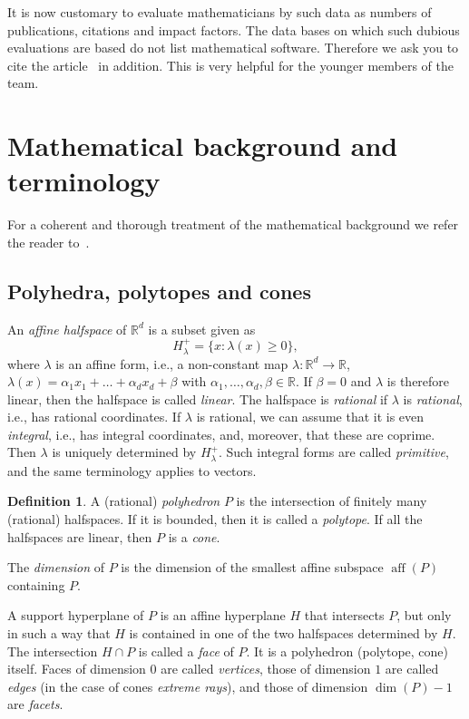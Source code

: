 \documentclass[12pt,a4paper]{scrartcl}
\theoremstyle{definition}
\newtheorem{definition}[theorem]{Definition}
\def\RR{{\mathbb R}}
\DeclareMathOperator{\aff}{aff}
\begin{document}
It is now customary to evaluate mathematicians by such data as
numbers of publications, citations and impact factors. The data
bases on which such dubious evaluations are based do not list
mathematical software. Therefore we ask you to cite the article~\cite{BIS}
in addition. This is very helpful for the younger
members of the team.

\newpage

\appendix

\section{Mathematical background and terminology}\label{AppBackground}

For a coherent and thorough treatment of the mathematical background we refer the reader to~\cite{BG}.

\subsection{Polyhedra, polytopes and cones}

An \emph{affine halfspace} of $\RR^d$ is a subset given as
$$
H_\lambda^+=\{x: \lambda(x)\ge 0\},
$$
where $\lambda$ is an affine form, i.e., a non-constant map $\lambda:\RR^d\to\RR$, $\lambda(x)=\alpha_1x_1+\dots+\alpha_dx_d+\beta$ with $\alpha_1,\dots,\alpha_d,\beta\in\RR$. If $\beta=0$ and $\lambda$ is therefore linear, then the halfspace is called \emph{linear}. The halfspace is \emph{rational} if $\lambda$ is \emph{rational}, i.e., has rational coordinates. If $\lambda$ is rational, we can assume that it is even \emph{integral}, i.e., has integral coordinates, and, moreover, that these are coprime. Then $\lambda$ is uniquely determined by $H_\lambda^+$. Such integral forms are called \emph{primitive}, and the same terminology applies to vectors.

\begin{definition}
	A (rational) \emph{polyhedron} $P$ is the intersection of finitely many (rational) halfspaces. If it is bounded, then it is called a \emph{polytope}. If all the halfspaces are linear, then $P$ is a \emph{cone}.
	
	The \emph{dimension} of $P$ is the dimension of the smallest affine subspace $\aff(P)$ containing $P$.
\end{definition}


A support hyperplane of $P$ is an affine hyperplane $H$ that intersects $P$, but only in such a way that $H$ is contained in one of the two halfspaces determined by $H$. The intersection $H\cap P$ is called a \emph{face} of $P$. It is a polyhedron (polytope, cone) itself. Faces of dimension $0$ are called \emph{vertices}, those of dimension $1$ are called \emph{edges} (in the case of cones \emph{extreme rays}), and those of dimension $\dim(P)-1$ are \emph{facets}.
\end{document}
